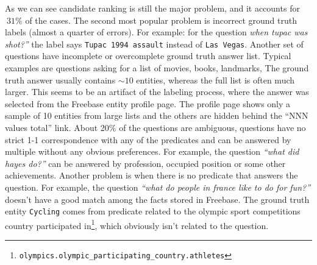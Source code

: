 As we can see candidate ranking is still the major problem, and it accounts for $~31\%$ of the cases.
The second most popular problem is incorrect ground truth labels (almost a quarter of errors).
For example: for the question \textit{when tupac was shot?''} the label says \texttt{Tupac 1994 assault} instead of \texttt{Las Vegas}.
Another set of questions have incomplete or overcomplete ground truth answer list.
Typical examples are questions asking for a list of movies, books, landmarks, \etc
The ground truth answer usually contains $\sim10$ entities, whereas the full list is often much larger.
This seems to be an artifact of the labeling process, where the answer was selected from the Freebase entity profile page.
The profile page shows only a sample of 10 entities from large lists and the others are hidden behind the ``NNN values total'' link.
About 20\% of the questions are ambiguous, \ie questions have no strict 1-1 correspondence with any of the predicates and can be answered by multiple without any obvious preferences.
For example, the question \textit{``what did hayes do?''} can be answered by profession, occupied position or some other achievements.
Another problem is when there is no predicate that answers the question.
For example, the question \textit{``what do people in france like to do for fun?''} doesn't have a good match among the facts stored in Freebase.
The ground truth entity \texttt{Cycling} comes from predicate related to the olympic sport competitions country participated in\footnote{\texttt{olympics.olympic\_participating\_country.athletes}}, which obviously isn't related to the question.



